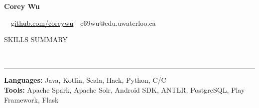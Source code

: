 \documentclass[11pt, letterpaper, oneside]{article}
\makeatletter
\newcommand{\name}{Corey Wu}
\newcommand{\github}{\href{https://github.com/coreywu}{github.com/coreywu}}
\newcommand{\email}{c69wu@edu.uwaterloo.ca}
\newcommand{\HRule}[2]{\textcolor{#1}{\rule{\linewidth}{#2}}}
\newcommand{\sectiontitle}[1]{\begin{minipage}{\textwidth}\vspace{-7.5pt}\begin{flushleft}\hspace{-20.5pt}\vspace{-25pt}
\Large\MakeUppercase{#1}\end{flushleft}\end{minipage}\\\HRule{black}{0.15mm}\vspace{\baselineskip}}
\newenvironment{ressection}[1]{
  \sectiontitle{#1}}
  {\vspace{-\baselineskip}}
\newcommand{\CPP}
{C\nolinebreak[4]\hspace{-.05em}\raisebox{.22ex}{\footnotesize\bf ++}}
\makeatother
\begin{document}
\begin{center}

	{\Huge \textbf{\name}}

	\ \ \github \ \textbullet \ \email \ \
\end{center}

\vspace{-6pt}

\begin{ressection}{Skills Summary}\vspace{-12pt}
  \hspace{-20pt} \textbf{Languages:} Java, Kotlin, Scala, Hack, Python, C/\CPP \\
  \hspace{-20pt} \textbf{Tools:} Apache Spark, Apache Solr, Android SDK, ANTLR,  PostgreSQL, Play Framework, Flask
\end{ressection}

\vspace{20pt}
\end{document}
